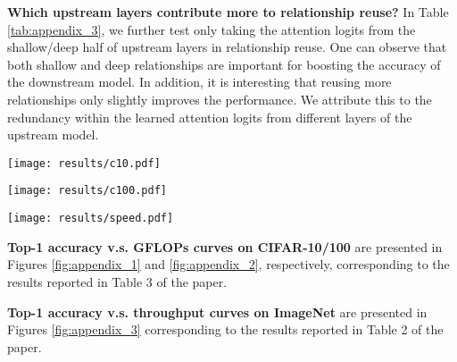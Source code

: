 \documentclass{article}
\begin{document}
\textbf{Which upstream layers contribute more to relationship reuse?} 
In Table \ref{tab:appendix_3}, we further test only taking the attention logits from the shallow/deep half of upstream layers in relationship reuse. One can observe that both shallow and deep relationships are important for boosting the accuracy of the downstream model. In addition, it is interesting that reusing more relationships only slightly improves the performance. We attribute this to the redundancy within the learned attention logits from different layers of the upstream model.


\begin{figure*}[t]
  \hskip -0.1in
  \begin{center}
  \centerline{\texttt{[image: results/c10.pdf]}}
  \vspace{-1ex}
  \caption{
      Top-1 accuracy v.s. GFLOPs on CIFAR-10. DVT is implemented on top of T2T-ViT-12/14.
  }
  \label{fig:appendix_1}
  \end{center}
  \vspace{-4ex}
\end{figure*}




\begin{figure*}[t]
  \hskip -0.1in
  \begin{center}
  \centerline{\texttt{[image: results/c100.pdf]}}
  \vspace{-1ex}
  \caption{
      Top-1 accuracy v.s. GFLOPs on CIFAR-100. DVT is implemented on top of T2T-ViT-12/14.
  }
  \label{fig:appendix_2}
  \end{center}
  \vspace{-4ex}
\end{figure*}




\begin{figure*}[!t]
  \hskip -0.1in
  \begin{center}
  \centerline{\texttt{[image: results/speed.pdf]}}
  \vspace{-1ex}
  \caption{
      Top-1 accuracy v.s. throughput on ImageNet. The results are obtained on NVIDIA 2080Ti GPU with a batch size of 128.
  }
  \label{fig:appendix_3}
  \end{center}
  \vspace{-4ex}
\end{figure*}


\textbf{Top-1 accuracy v.s. GFLOPs curves on CIFAR-10/100} 
are presented in Figures \ref{fig:appendix_1} and \ref{fig:appendix_2}, respectively, corresponding to the results reported in Table 3 of the paper.


\textbf{Top-1 accuracy v.s. throughput curves on ImageNet} 
are presented in Figures \ref{fig:appendix_3} corresponding to the results reported in Table 2 of the paper.
\end{document}
